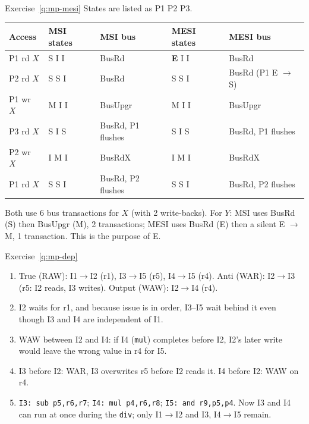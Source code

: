 \begin{noot}{Exercise~\ref{q:mp-mesi}}
States are listed as P1 P2 P3.
\begin{center}
\small
\begin{tabular}{@{}lllll@{}}
\toprule
Access & MSI states & MSI bus & MESI states & MESI bus \\
\midrule
P1 rd $X$ & S I I & BusRd & \textbf{E} I I & BusRd \\
P2 rd $X$ & S S I & BusRd & S S I & BusRd (P1 E $\to$ S) \\
P1 wr $X$ & M I I & BusUpgr & M I I & BusUpgr \\
P3 rd $X$ & S I S & BusRd, P1 flushes & S I S & BusRd, P1 flushes \\
P2 wr $X$ & I M I & BusRdX & I M I & BusRdX \\
P1 rd $X$ & S S I & BusRd, P2 flushes & S S I & BusRd, P2 flushes \\
\bottomrule
\end{tabular}
\end{center}
Both use 6 bus transactions for $X$ (with 2 write-backs). For $Y$: MSI uses BusRd
(S) then BusUpgr (M), 2 transactions; MESI uses BusRd (E) then a silent E $\to$ M,
1 transaction. This is the purpose of E.
\end{noot}

\begin{noot}{Exercise~\ref{q:mp-dep}}
\begin{enumerate}[label=(\alph*),leftmargin=*]
  \item True (RAW): I1$\to$I2 (r1), I3$\to$I5 (r5), I4$\to$I5 (r4). Anti (WAR):
  I2$\to$I3 (r5: I2 reads, I3 writes). Output (WAW): I2$\to$I4 (r4).
  \item I2 waits for r1, and because issue is in order, I3--I5 wait behind it even
  though I3 and I4 are independent of I1.
  \item WAW between I2 and I4: if I4 (\texttt{mul}) completes before I2, I2's later
  write would leave the wrong value in r4 for I5.
  \item I3 before I2: WAR, I3 overwrites r5 before I2 reads it. I4 before I2: WAW on
  r4.
  \item \texttt{I3: sub p5,r6,r7}; \texttt{I4: mul p4,r6,r8};
  \texttt{I5: and r9,p5,p4}. Now I3 and I4 can run at once during the \texttt{div};
  only I1$\to$I2 and I3, I4$\to$I5 remain.
\end{enumerate}
\end{noot}

